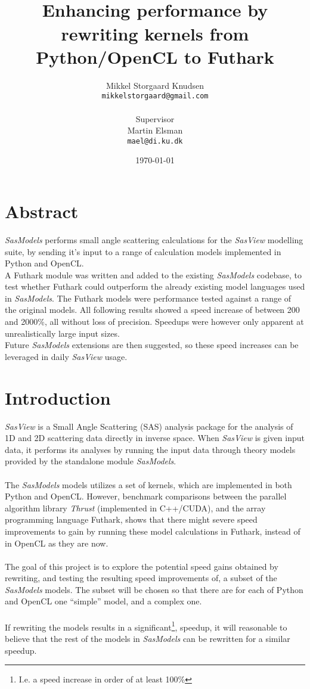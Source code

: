 \documentclass[11pt]{article}
\title{
  \vspace{3cm}
  \Huge{\futhark}\\
  \Large{Enhancing performance by rewriting kernels from Python/OpenCL to
    Futhark}
}
\author{
  \Large{Mikkel Storgaard Knudsen}\\
  \texttt{mikkelstorgaard@gmail.com}\\
  \\
  \Large{Supervisor}\\
  Martin Elsman\\
  \texttt{mael@di.ku.dk}
}
\date{
    \today
}
\def \ColourPDF {include/ku-farve}
\def \TitlePDF   {include/ku-en}  %
\newcommand{\sasmodels}{\textit{SasModels}}
\newcommand{\sasview}{\textit{SasView}}
\begin{document}


\clearpage\maketitle
\thispagestyle{empty}
\clearpage
\section*{Abstract}
\sasmodels{} performs small angle scattering calculations for the \sasview{}
modelling suite, by sending it's input to a range of calculation models
implemented in Python and OpenCL. 
\\
A Futhark module was written and added to the 
existing \sasmodels{} codebase, to test whether Futhark could outperform the 
already existing model languages used in \sasmodels{}. The Futhark models
were performance tested against a range of the original models.
All following results showed a speed increase of between 200 and 2000\%, 
all without loss of precision.  Speedups were however only apparent at 
unrealistically large input sizes.
\\
Future \sasmodels{} extensions are then suggested, so these speed increases can be 
leveraged in daily \sasview{} usage.

\newpage

\section{Introduction}
\sasview{} is a Small Angle Scattering (SAS) analysis package for the
analysis of 1D and 2D scattering data directly in inverse space.
When \sasview{} is given input data, it performs its analyses by running the
input data through theory models provided by the standalone module
\sasmodels{}.
\\\\
The \sasmodels{} models utilizes a set of kernels, which are implemented
in both Python and OpenCL. However, benchmark
comparisons\cite{futhark}
between the parallel algorithm library \textit{Thrust}
(implemented in C++/CUDA), and the array programming language Futhark, shows
that there might severe speed improvements to gain by running these model
calculations in Futhark, instead of in OpenCL as they are now.
\\\\
The goal of this project is to explore the potential speed gains obtained by
rewriting, and testing the resulting speed improvements of, a subset of the
\sasmodels{} models.
The subset will be chosen so that there are for each of Python and OpenCL 
one ``simple'' model, and a complex one.
\\\\
If rewriting the models results in a significant\footnote{I.e. a speed increase
  in order of at least 100\%}, speedup, it will reasonable to believe that 
  the rest of the models in \sasmodels{} can be rewritten for a similar
  speedup.
\end{document}
